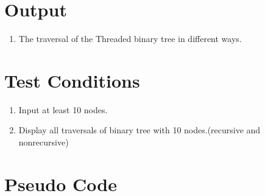 \documentclass[11pt]{article}
\begin{document}
\section{Output}
\begin{enumerate}
    \item The traversal of the Threaded binary tree in different ways.
\end{enumerate}

\section{Test Conditions}
\begin{enumerate}
    \item Input at least 10 nodes.
    \item Display all traversals of binary tree with 10 nodes.(recursive and nonrecursive)
\end{enumerate}

\section{Pseudo Code}
\end{document}

